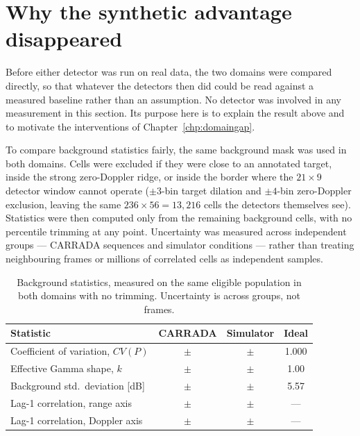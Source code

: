 \section{Why the synthetic advantage disappeared}
\label{sec:r7audit}

Before either detector was run on real data, the two domains were compared directly, so that
whatever the detectors then did could be read against a measured baseline rather than an assumption.
No detector was involved in any measurement in this section. Its purpose here is to explain the
result above and to motivate the interventions of Chapter~\ref{chp:domaingap}.

To compare background statistics fairly, the same background mask was used in both domains. Cells
were excluded if they were close to an annotated target, inside the strong zero-Doppler ridge, or
inside the border where the $21 \times 9$ detector window cannot operate ($\pm 3$-bin target
dilation and $\pm 4$-bin zero-Doppler exclusion, leaving the same
$236 \times 56 = 13{,}216$ cells the detectors themselves see). Statistics were then computed only
from the remaining background cells, with no percentile trimming at any point. Uncertainty was
measured across independent groups --- CARRADA sequences and simulator conditions --- rather than
treating neighbouring frames or millions of correlated cells as independent samples.

\begin{table}[H]
\centering
\caption{Background statistics, measured on the same eligible population in both domains with no
trimming. Uncertainty is across groups, not frames.}
\label{tab:r0_stats}
\small
\begin{tabular}{@{}lccc@{}}
\toprule
\textbf{Statistic} & \textbf{CARRADA} & \textbf{Simulator} & \textbf{Ideal} \\
\midrule
Coefficient of variation, $CV(P)$ & \RzeroCarradaCV{} $\pm$ \RzeroCarradaCVSE{} & \RzeroSimCV{} $\pm$ \RzeroSimCVSE{} & 1.000 \\
Effective Gamma shape, $k$        & \RzeroCarradaGammaK{} $\pm$ \RzeroCarradaGammaKSE{} & \RzeroSimGammaK{} $\pm$ \RzeroSimGammaKSE{} & 1.00 \\
Background std.\ deviation [dB]  & \RzeroCarradaDBstd{} $\pm$ \RzeroCarradaDBstdSE{} & \RzeroSimDBstd{} $\pm$ \RzeroSimDBstdSE{} & 5.57 \\
Lag-1 correlation, range axis     & \RzeroCarradaLagRange{} $\pm$ \RzeroCarradaLagRangeSE{} & \RzeroSimLagRange{} $\pm$ \RzeroSimLagRangeSE{} & --- \\
Lag-1 correlation, Doppler axis   & \RzeroCarradaLagDoppler{} $\pm$ \RzeroCarradaLagDopplerSE{} & \RzeroSimLagDoppler{} $\pm$ \RzeroSimLagDopplerSE{} & --- \\
\bottomrule
\end{tabular}
\end{table}

